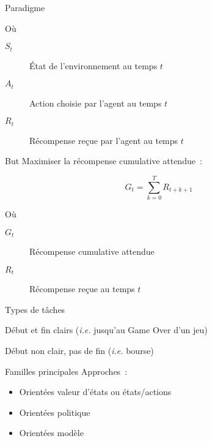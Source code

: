 \begin{frame}{Paradigme}

  Où

  \begin{description}
    \item[$S_t$] État de l'environnement au temps $t$
    \item[$A_t$] Action choisie par l'agent au temps $t$
    \item[$R_t$] Récompense reçue par l'agent au temps $t$
  \end{description}
\end{frame}

\begin{frame}{But}
  Maximiser la récompense cumulative attendue~:

  \[
    G_t = \sum_{k=0}^T R_{t+k+1}
  \]

  Où

  \begin{description}
    \item[$G_t$] Récompense cumulative attendue
    \item[$R_t$] Récompense reçue au temps $t$
  \end{description}
\end{frame}

\begin{frame}{Types de tâches}
  \begin{description}[<+->]
    \item[Épisodique] Début et fin clairs (\textit{i.e.} jusqu'au Game Over d'un jeu)
    \item[Continue] Début non clair, pas de fin (\textit{i.e.} bourse)
  \end{description}
\end{frame}

\begin{frame}{Familles principales}
  Approches~:

  \begin{itemize}
    \item Orientées valeur d'états ou états/actions
    \item Orientées politique
    \item Orientées modèle
  \end{itemize}
\end{frame}

